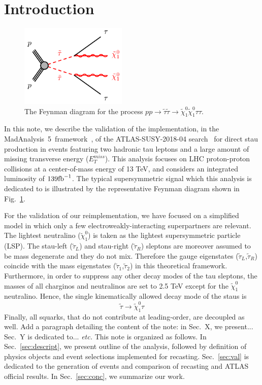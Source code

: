 \documentclass{ws-mpla}
\newcommand{\madanalysis}{{\sc MadAnalysis~5}}
\begin{document}
\section{Introduction}

\begin{figure}[t]
  \centerline{\includegraphics[width=2.0in]{fig_01}}
  \vspace*{8pt}
  \caption{The Feynman diagram for the process $pp\rightarrow\tilde{\tau}\tilde{\tau}\rightarrow\tilde{\chi}^0_1\tilde{\chi}^0_1\tau\tau$.\protect\label{fig:fig_01}}
\end{figure}

In this note, we describe the validation of the implementation, in the \madanalysis\ framework~\cite{Conte:2018vmg,Dumont:2014tja,Conte:2014zja,Conte:2012fm}, of the ATLAS-SUSY-2018-04 search~\cite{Aad:2019byo} for direct stau production in events featuring two hadronic tau leptons and a large amount of missing transverse energy ($E^{miss}_T$).
This analysis focuses on LHC proton-proton collisions at a center-of-mass energy of 13 TeV, and considers an integrated luminosity of $139 {\rm fb}^{-1}$.
The typical supersymmetric signal which this analysis is dedicated to is illustrated by the representative Feynman diagram shown in Fig.~\ref{fig:fig_01}. 

For the validation of our reimplementation, we have focused on a simplified model in which only a few electroweakly-interacting superpartners are relevant.
The lightest neutralino ($\tilde{\chi}^0_1$) is taken as the lightest supersymmetric particle (LSP).
The stau-left ($\tilde{\tau}_L$) and stau-right ($\tilde{\tau}_R$) sleptons are moreover assumed to be mass degenerate and they do not mix. Therefore the gauge eigenstates ($\tilde{\tau}_L$,$\tilde{\tau}_R$) coincide with the mass eigenstates ($\tilde{\tau}_1$,$\tilde{\tau}_2$) in this theoretical framework.
Furthermore, in order to suppress any other decay modes of the tau sleptons, the masses of all charginos and neutralinos are set to 2.5 TeV except for the $\tilde{\chi}^0_1$ neutralino. 
Hence, the single kinematically allowed decay mode of the staus is 
\begin{equation}
\tilde{\tau}\rightarrow\tilde{\chi}^0_1 \tau 
\end{equation}
Finally, all squarks, that do not contribute at leading-order, are decoupled as well.
{\color{red}Add a paragraph detailing the content of the note: in Sec.~X, we present... Sec.~Y is dedicated to... {\it etc.} }
{\color{blue}This note is organized as follows. In Sec.~\ref{sec:descript}, we present outline of the analysis, followed by definition of physics objects and event selections implemented for recasting. Sec.~\ref{sec:val} is dedicated to the generation of events and comparison of recasting and ATLAS official results. In Sec.~\ref{sec:conc}, we summarize our work.}
\end{document}
